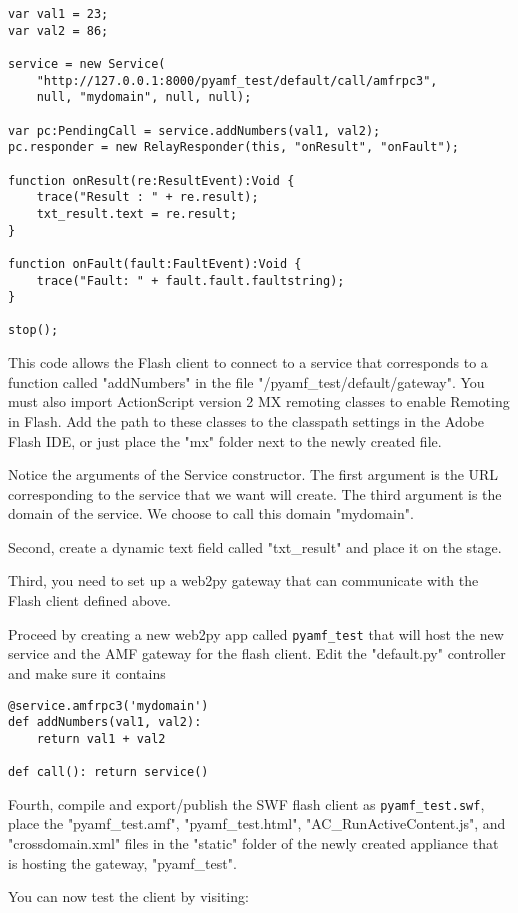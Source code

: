 \documentclass[justified,sixbynine,notoc]{tufte-book}
\def\ft{\small\tt}
\begin{document}
\begin{fullwidth}
\begin{lstlisting}
var val1 = 23;
var val2 = 86;

service = new Service(
    "http://127.0.0.1:8000/pyamf_test/default/call/amfrpc3",
    null, "mydomain", null, null);

var pc:PendingCall = service.addNumbers(val1, val2);
pc.responder = new RelayResponder(this, "onResult", "onFault");

function onResult(re:ResultEvent):Void {
    trace("Result : " + re.result);
    txt_result.text = re.result;
}

function onFault(fault:FaultEvent):Void {
    trace("Fault: " + fault.fault.faultstring);
}

stop();
\end{lstlisting}

This code allows the Flash client to connect to a service that corresponds to a function called "addNumbers" in the file "/pyamf\_test/default/gateway". You must also import ActionScript version 2 MX remoting classes to enable Remoting in Flash. Add the path to these classes to the classpath settings in the Adobe Flash IDE, or just place the "mx" folder next to the newly created file.

Notice the arguments of the Service constructor. The first argument is the URL corresponding to the service that we want will create. The third argument is the domain of the service. We choose to call this domain "mydomain".

Second, create a dynamic text field called
"txt\_result" and place it on the stage.

Third, you need to set up a web2py gateway that can communicate with the Flash client defined above.

Proceed by creating a new web2py app called {\ft pyamf\_test} that will host the new service and the AMF gateway for the flash client.
Edit the "default.py" controller and make sure it contains
\begin{lstlisting}
@service.amfrpc3('mydomain')
def addNumbers(val1, val2):
    return val1 + val2

def call(): return service()
\end{lstlisting}

Fourth, compile and export/publish the SWF flash client as {\ft pyamf\_test.swf}, place the "pyamf\_test.amf", "pyamf\_test.html", "AC\_RunActiveContent.js", and "crossdomain.xml" files in the "static" folder of the newly created appliance that is hosting the gateway, "pyamf\_test".

You can now test the client by visiting:


\end{fullwidth}
\end{document}

